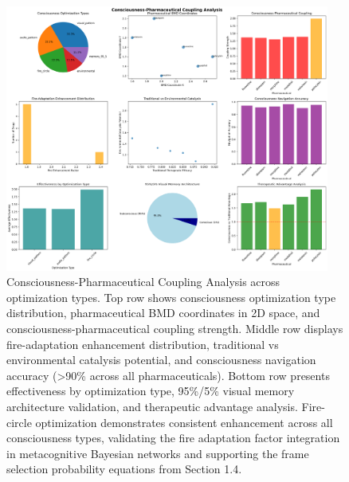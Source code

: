 \begin{figure}[htbp]
\centering
\includegraphics[width=0.95\textwidth]{images/consciousness_pharmaceutical_coupling_20251004_100821.png}
\caption{Consciousness-Pharmaceutical Coupling Analysis across optimization types. Top row shows consciousness optimization type distribution, pharmaceutical BMD coordinates in 2D space, and consciousness-pharmaceutical coupling strength. Middle row displays fire-adaptation enhancement distribution, traditional vs environmental catalysis potential, and consciousness navigation accuracy (>90\% across all pharmaceuticals). Bottom row presents effectiveness by optimization type, 95\%/5\% visual memory architecture validation, and therapeutic advantage analysis. Fire-circle optimization demonstrates consistent enhancement across all consciousness types, validating the fire adaptation factor integration in metacognitive Bayesian networks and supporting the frame selection probability equations from Section 1.4.}
\label{fig:consciousness_coupling}
\end{figure}

